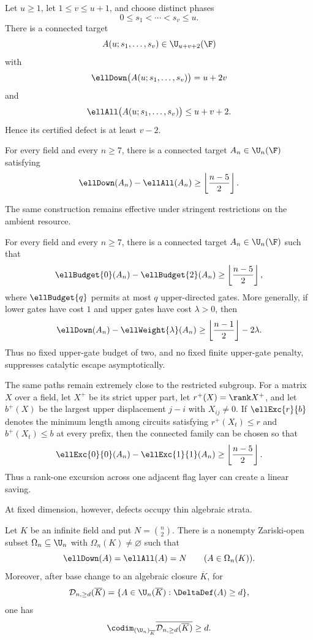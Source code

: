 \begin{theorem}\label{thm:snapshot-family}
Let $u\ge1$, let $1\le v\le u+1$, and choose distinct phases
\[
0\le s_1<\cdots<s_v\le u.
\]
There is a connected target
\[
A(u;s_1,\ldots,s_v)\in\U_{u+v+2}(\F)
\]
with
\[
\ellDown\bigl(A(u;s_1,\ldots,s_v)\bigr)=u+2v
\]
and
\[
\ellAll\bigl(A(u;s_1,\ldots,s_v)\bigr)\le u+v+2.
\]
Hence its certified defect is at least $v-2$.
\end{theorem}

\begin{corollary}\label{cor:connected-gap}
For every field and every $n\ge7$, there is a connected target $A_n\in\U_n(\F)$ satisfying
\[
\ellDown(A_n)-\ellAll(A_n)
\ge
\left\lfloor\frac{n-5}{2}\right\rfloor.
\]
\end{corollary}

The same construction remains effective under stringent restrictions on the ambient resource.

\begin{theorem}\label{thm:resource-robustness}
For every field and every $n\ge7$, there is a connected target $A_n\in\U_n(\F)$ such that
\[
\ellBudget{0}(A_n)-\ellBudget{2}(A_n)
\ge
\left\lfloor\frac{n-5}{2}\right\rfloor,
\]
where $\ellBudget{q}$ permits at most $q$ upper-directed gates.  More generally, if lower gates have cost $1$ and upper gates have cost $\lambda>0$, then
\[
\ellDown(A_n)-\ellWeight{\lambda}(A_n)
\ge
\left\lfloor\frac{n-1}{2}\right\rfloor-2\lambda.
\]
Thus no fixed upper-gate budget of two, and no fixed finite upper-gate penalty, suppresses catalytic escape asymptotically.
\end{theorem}

The same paths remain extremely close to the restricted subgroup.  For a matrix $X$ over a field, let $X^+$ be its strict upper part, let $r^+(X)=\rank X^+$, and let $b^+(X)$ be the largest upper displacement $j-i$ with $X_{ij}\ne0$.  If $\ellExc{r}{b}$ denotes the minimum length among circuits satisfying $r^+(X_t)\le r$ and $b^+(X_t)\le b$ at every prefix, then the connected family can be chosen so that
\[
\ellExc{0}{0}(A_n)-\ellExc{1}{1}(A_n)
\ge
\left\lfloor\frac{n-5}{2}\right\rfloor.
\]
Thus a rank-one excursion across one adjacent flag layer can create a linear saving.

At fixed dimension, however, defects occupy thin algebraic strata.

\begin{theorem}\label{thm:generic-rigidity-intro}
Let $K$ be an infinite field and put $N=\binom n2$.  There is a nonempty Zariski-open subset $\Omega_n\subseteq\U_n$ with $\Omega_n(K)\ne\varnothing$ such that
\[
\ellDown(A)=\ellAll(A)=N
\qquad(A\in\Omega_n(K)).
\]
Moreover, after base change to an algebraic closure $\overline K$, for
\[
\mathcal D_{n,\ge d}(\overline K)
=\{A\in\U_n(\overline K):\DeltaDef(A)\ge d\},
\]
one has
\[
\codim_{(\U_n)_{\overline K}}
\overline{\mathcal D_{n,\ge d}(\overline K)}\ge d.
\]
\end{theorem}

